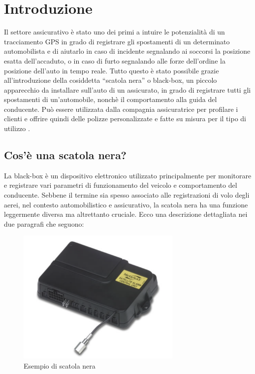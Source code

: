 \documentclass[12pt, a4paper, italian]{report}
\numberwithin{figure}{chapter}
\numberwithin{table}{chapter}
\begin{document}
\chapter{Introduzione}
Il settore assicurativo è stato uno dei primi a intuire le potenzialità di un tracciamento GPS in grado di registrare gli spostamenti di un determinato automobilista
e di aiutarlo in caso di incidente segnalando ai soccorsi la posizione esatta dell’accaduto, o in caso di furto segnalando alle forze dell’ordine la posizione dell’auto in
tempo reale. Tutto questo è stato possibile grazie all’introduzione della cosiddetta
“scatola nera” o black-box, un piccolo apparecchio da installare sull’auto di un
assicurato, in grado di registrare tutti gli spostamenti di un’automobile, nonchè il
comportamento alla guida del conducente. Può essere utilizzata dalla compagnia
assicuratrice per profilare i clienti e offrire quindi delle polizze personalizzate e fatte su misura per il tipo di utilizzo
\cite{fracassi2012}.
\section{Cos'è una scatola nera?}
La black-box è un dispositivo elettronico utilizzato principalmente per monitorare e registrare vari parametri di funzionamento del veicolo e comportamento del conducente. Sebbene il termine sia spesso associato alle registrazioni di volo degli aerei, nel contesto automobilistico e assicurativo, la scatola nera ha una funzione leggermente diversa ma altrettanto cruciale. Ecco una descrizione dettagliata nei due paragrafi che seguono:

\begin{figure}[h] \centering
\includegraphics[width=8cm]{esempioScatolaNera.png}
\caption{Esempio di scatola nera\protect\footnotemark}
\label{fig:scatolaNera}
\end{figure}
\end{document}
